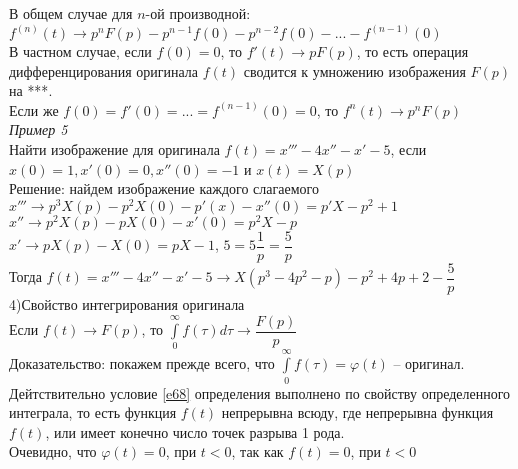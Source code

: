 \documentclass{article}
\numberwithin{equation}{section}
\begin{document}
В общем случае для $n$-ой производной:\\
$f^{(n)}(t)\rightarrow p^nF(p)-p^{n-1}f(0)-p^{n-2}f(0)-...-f^{(n-1)}(0)$\\
В частном случае, если $f(0)=0$, то $f'(t)\rightarrow pF(p)$, то есть операция дифференцирования оригинала $f(t)$ сводится к умножению изображения $F(p)$ на \colorbox{red!50}{***}.\\
Если же $f(0)=f'(0)=...=f^{(n-1)}(0)=0$, то $f^n(t)\rightarrow p^nF(p)$\\
\textit{Пример 5}\\
Найти изображение для оригинала $f(t)=x'''-4x''-x'-5$, если $x(0)=1,x'(0)=0,x''(0)=-1$ и $x(t)=X(p)$\\
Решение: найдем изображение каждого слагаемого\\
$x'''\rightarrow p^3X(p)-p^2X(0)-p'(x)-x''(0)=p'X-p^2+1$\\
$x''\rightarrow p^2X(p)-pX(0)-x'(0)=p^2X-p$\\
$x'\rightarrow pX(p)-X(0)=pX-1$, $5=5\dfrac{1}{p}=\dfrac{5}{p}$\\
Тогда $f(t)=x'''-4x''-x'-5\rightarrow X(p^3-4p^2-p)-p^2+4p+2-\dfrac{5}{p}$\\
4)Свойство интегрирования оригинала\\
Если $f(t)\rightarrow F(p)$, то $\int\limits_0^\infty f(\tau)d\tau\rightarrow\dfrac{F(p)}{p}$\\
Доказательство: покажем прежде всего, что $\int\limits_0^\infty f(\tau)=\varphi(t)$ -- оригинал.\\
Дейтствительно условие \eqref{e68} определения выполнено по свойству определенного интеграла, то есть функция $f(t)$ непрерывна всюду, где непрерывна функция $f(t)$, или имеет конечно число точек разрыва 1 рода.\\
Очевидно, что $\varphi(t)=0$, при $t<0$, так как $f(t)=0$, при $t<0$
\end{document}
